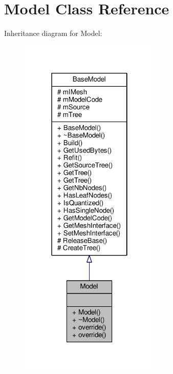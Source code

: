 \hypertarget{classModel}{}\section{Model Class Reference}
\label{classModel}


Inheritance diagram for Model\+:
\nopagebreak
\begin{figure}[H]
\begin{center}
\leavevmode
\includegraphics[width=190pt]{de/d52/classModel__inherit__graph}
\end{center}
\end{figure}


